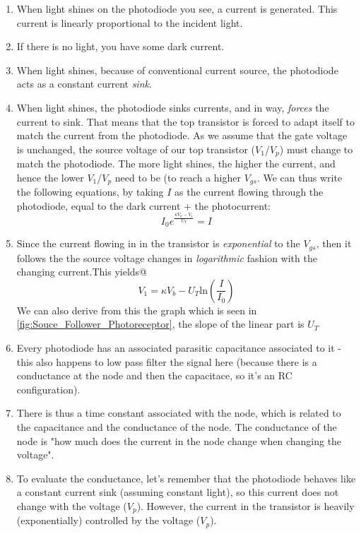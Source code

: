 \begin{enumerate}
    \item When light shines on the photodiode you see, a current is generated. This current is linearly proportional to the incident light.
    \item If there is no light, you have some dark current. 
    \item When light shines, because of conventional current source, the photodiode acts as a constant current \textit{sink}.
    \item When light shines, the photodiode sinks currents, and in way, \textit{forces} the current to sink. That means that the top transistor is forced to adapt itself to match the current from the photodiode. As we assume that the gate voltage is unchanged, the source voltage of our top transistor ($V_1$/$V_p$) must change to match the photodiode. The more light shines, the higher the current, and hence the lower $V_1$/$V_p$ need to be (to reach a higher $V_{gs}$. We can thus write the following equations, by taking $I$ as the current flowing through the photodiode, equal to the dark current + the photocurrent:
    \begin{equation}
        I_0e^{\frac{\kappa V_b - V_1}{U_T}} = I
    \end{equation}
    \item Since the current flowing in  in the transistor is \textit{exponential} to the $V_{gs}$, then it follows the the source voltage changes in \textit{logarithmic} fashion with the changing current.This yields@
    \begin{equation}
        V_1 = \kappa V_b - U_T\mathrm{ln}(\frac{I}{I_0})
    \end{equation}
    We can also derive from this the graph which is seen in \ref{fig:Souce_Follower_Photoreceptor}, the slope of the linear part is $U_T$
    \item Every photodiode has an associated parasitic capacitance associated to it - this also happens to low pass filter the signal here (because there is a conductance at the node and then the capacitace, so it's an RC configuration). 
    \item There is thus a time constant associated with the node, which is related to the capacitance and the conductance of the node. The conductance of the node is "how much does the current in the node change when changing the voltage".
    \item To evaluate the conductance, let's remember that the photodiode behaves like a constant current sink (assuming constant light), so this current does not change with the voltage ($V_p$). However, the current in the transistor is heavily (exponentially) controlled by the voltage ($V_p$). 

\end{enumerate}
